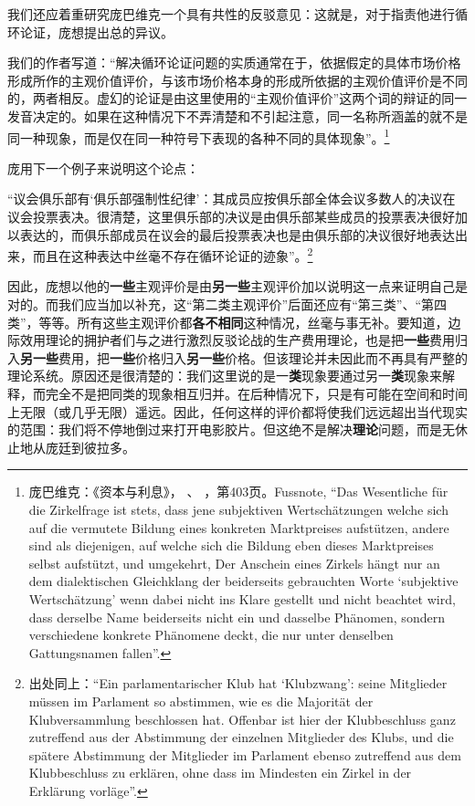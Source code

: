 \documentclass[fontset=fandol, a4paper, 12pt, openright]{ctexbook}
\newcommand{\RN}[1]{%
  \textup{\uppercase\expandafter{\romannumeral#1}}%
}
\begin{document}
我们还应着重研究庞巴维克一个具有共性的反驳意见：这就是，对于指责他进行循环论证，庞想提出总的异议。

我们的作者写道：“解决循环论证问题的实质通常在于，依据假定的具体市场价格形成所作的主观价值评价，与该市场价格本身的形成所依据的主观价值评价是不同的，两者相反。虚幻的论证是由这里使用的“主观价值评价”这两个词的辩证的同一发音决定的。如果在这种情况下不弄清楚和不引起注意，同一名称所涵盖的就不是同一种现象，而是仅在同一种符号下表现的各种不同的具体现象”。\footnote{庞巴维克：《资本与利息》，\RN{2}、\RN{1}，第403页。Fussnote, ``Das Wesentliche f\"{u}r die Zirkelfrage ist stets, dass jene subjektiven Wertsch\"{a}tzungen welche sich auf die vermutete Bildung eines konkreten Marktpreises aufst\"{u}tzen, andere sind als diejenigen, auf welche sich die Bildung eben dieses Marktpreises selbst aufst\"{u}tzt, und umgekehrt, Der Anschein eines Zirkels h\"{a}ngt nur an dem dialektischen Gleichklang der beiderseits gebrauchten Worte `subjektive Wertsch\"{a}tzung' wenn dabei nicht ins Klare gestellt und nicht beachtet wird, dass derselbe Name beiderseits nicht ein und dasselbe Ph\"{a}nomen, sondern verschiedene konkrete Ph\"{a}nomene deckt, die nur unter denselben Gattungsnamen fallen''.}

庞用下一个例子来说明这个论点：

“议会俱乐部有‘俱乐部强制性纪律’：其成员应按俱乐部全体会议多数人的决议在议会投票表决。很清楚，这里俱乐部的决议是由俱乐部某些成员的投票表决很好加以表达的，而俱乐部成员在议会的最后投票表决也是由俱乐部的决议很好地表达出来，而且在这种表达中丝毫不存在循环论证的迹象”。\footnote{出处同上：“Ein parlamentarischer Klub hat `Klubzwang': seine Mitglieder m\"{u}ssen im Parlament so abstimmen, wie es die Majorit\"{a}t der Klubversammlung beschlossen hat. Offenbar ist hier der Klubbeschluss ganz zutreffend aus der Abstimmung der einzelnen Mitglieder des Klubs, und die sp\"{a}tere Abstimmung der Mitglieder im Parlament ebenso zutreffend aus dem Klubbeschluss zu erkl\"{a}ren, ohne dass im Mindesten ein Zirkel in der Erkl\"{a}rung vorl\"{a}ge''.}

因此，庞想以他的\textbf{一些}主观评价是由\textbf{另一些}主观评价加以说明这一点来证明自己是对的。而我们应当加以补充，这“第二类主观评价”后面还应有“第三类”、“第四类”，等等。所有这些主观评价都\textbf{各不相同}这种情况，丝毫与事无补。要知道，边际效用理论的拥护者们与之进行激烈反驳论战的生产费用理论，也是把\textbf{一些}费用归入\textbf{另一些}费用，把\textbf{一些}价格归入\textbf{另一些}价格。但该理论并未因此而不再具有严整的理论系统。原因还是很清楚的：我们这里说的是一\textbf{类}现象要通过另一\textbf{类}现象来解释，而完全不是把同类的现象相互归并。在后种情况下，只是有可能在空间和时间上无限（或几乎无限）遥远。因此，任何这样的评价都将使我们远远超出当代现实的范围：我们将不停地倒过来打开电影胶片。但这绝不是解决\textbf{理论}问题，而是无休止地从庞廷到彼拉多。
\end{document}

